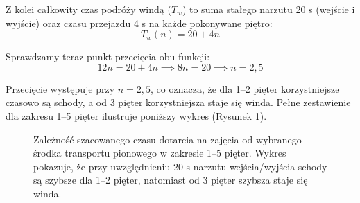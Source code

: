 \documentclass[14pt,a4paper]{extarticle}
\begin{document}
Z kolei całkowity czas podróży windą ($T_w$) to suma stałego narzutu 20 s (wejście i wyjście) oraz czasu przejazdu 4 s na każde pokonywane piętro:
\begin{equation}
    T_w(n) = 20 + 4n
\end{equation}

Sprawdzamy teraz punkt przecięcia obu funkcji:
\begin{equation}
    12n = 20 + 4n \implies 8n = 20 \implies n = 2{,}5
\end{equation}

Przecięcie występuje przy $n=2{,}5$, co oznacza, że dla 1--2 pięter korzystniejsze czasowo są schody, a od 3 pięter korzystniejsza staje się winda. Pełne zestawienie dla zakresu 1--5 pięter ilustruje poniższy wykres (Rysunek \ref{fig:wykres-windy}).

\begin{figure}[H]
    \centering
    \caption{Zależność szacowanego czasu dotarcia na zajęcia od wybranego środka transportu pionowego w zakresie 1--5 pięter. Wykres pokazuje, że przy uwzględnieniu 20 s narzutu wejścia/wyjścia schody są szybsze dla 1--2 pięter, natomiast od 3 pięter szybsza staje się winda.}
    \label{fig:wykres-windy}
\end{figure}
\end{document}
